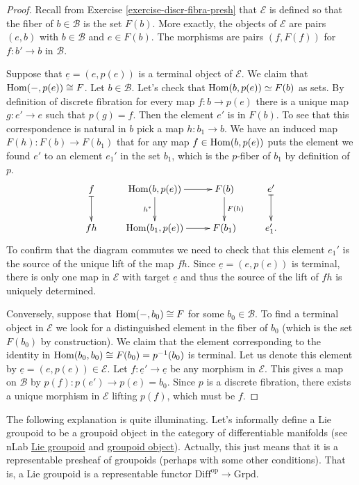 \begin{proof}
Recall from Exercise
\ref{exercise-discr-fibra-presh}
that $\mathcal{E}$ is defined so that the
fiber of $b \in \mathcal{B}$
is the set $F(b)$. More exactly, the objects
of $\mathcal{E}$
are pairs $(e,b)$ with $b \in \mathcal{B}$
and $e \in F(b)$.
The morphisms are pairs $(f,F(f))$ for $f:b'
\to b$ in $\mathcal{B}$.

Suppose that $\underline{e}=(e,p(e))$ is a
terminal object of $\mathcal{E}$.
We claim that $\mathop{\mathrm{Hom}}\nolimits(-,p(e))\cong F$.
Let $b \in \mathcal{B}$. Let's check that
$\mathop{\mathrm{Hom}}\nolimits(b,p(e))\simeq F(b)$ as sets.
By definition of discrete
fibration for every map $f:b\to p(e)$
there is a unique map $g:e' \to e$ such that
$p(g)=f$.
Then the element $e'$ is in $F(b)$.
To see that this correspondence is natural in
$b$
pick a map $h:b_1 \to b$.
We have an induced map $F(h):F(b) \to F(b_1)$
that for any map $f \in \mathop{\mathrm{Hom}}\nolimits(b,p(e))$
puts the element we found $e'$
to an element $e_1'$ in the set $b_1$,
which is the $p$-fiber of $b_1$ by definition
of $p$.
$$
\xymatrix{
f\ar@{|->}[d]&\Hom(b,p(e))\ar[r]\ar[d]_{h^*}&
F(b)\ar[d]^{F(h)}&e'\ar@{|->}[d]\\
fh&\Hom(b_1,p(e))\ar[r]&F(b_1)& e_1'.
}
$$
To confirm that the diagram commutes we need
to check
that this element $e_1'$ is the source of the
unique
lift of the map $fh$. Since
$\underline{e}=(e,p(e))$ is terminal,
there is only one map in $\mathcal{E}$
with target $\underline{e}$ and thus
the source of the lift of $fh$ is uniquely
determined.

Conversely, suppose that $\mathop{\mathrm{Hom}}\nolimits(-,b_0)\cong F$
for some $b_0 \in \mathcal{B}$.
To find a terminal object in $\mathcal{E}$ we
look
for a distinguished element in the fiber of
$b_0$
(which is the set $F(b_0)$ by construction).
We claim that the element corresponding to
the identity
in $\mathop{\mathrm{Hom}}\nolimits(b_0,b_0)\cong F(b_0)=p^{-1}(b_0)$
is terminal. Let us denote this element by
$\underline{e}=(e,p(e)) \in \mathcal{E}$.
Let $f:\underline{e}' \to \underline{e}$ be
any morphism in $\mathcal{E}$.
This gives a map on $\mathcal{B}$ by
$p(f):p(e')\to p(e)=b_0$.
Since $p$ is a discrete fibration, there
exists a unique morphism
in $\mathcal{E}$ lifting $p(f)$, which must
be $f$.
\end{proof}

\medskip\noindent
The following explanation is quite
illuminating.
Let's informally define a Lie groupoid to be
a groupoid object
in the category of differentiable manifolds
(see nLab \href{url}{Lie groupoid} and
\href{https://ncatlab.org/nlab/show/Lie+%
groupoid}{groupoid
object}).
Actually, this just means that it is a
representable
presheaf of groupoids (perhaps with some
other conditions).
That is, a Lie groupoid is a representable
functor
$\text{Diff}^{\text{op}}\to \text{Grpd}$.

